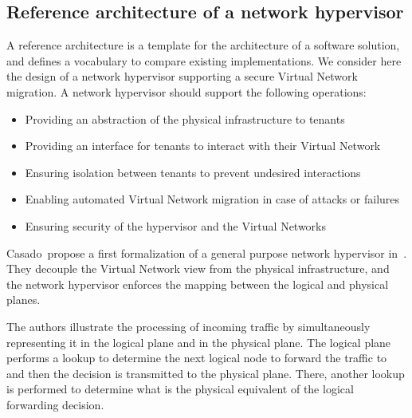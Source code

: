\newpage
\subsection{Reference architecture of a network hypervisor}
\label{sec:reference_archi}
A reference architecture is a template for the architecture of a software solution, and defines a vocabulary to compare existing implementations. 
We consider here the design of a network hypervisor supporting a secure Virtual Network migration.
A network hypervisor should support the following operations:
\begin{itemize}
    \item Providing an abstraction of the physical infrastructure to tenants
    \item Providing an interface for tenants to interact with their Virtual Network
    \item Ensuring isolation between tenants to prevent undesired interactions 
    \item Enabling automated Virtual Network migration in case of attacks or failures
    \item Ensuring security of the hypervisor and the Virtual Networks
\end{itemize}

Casado~\etal propose a first formalization of a general purpose network hypervisor in~\cite{Netvirt_Definition-Casado2010}. They decouple the Virtual Network view from the physical infrastructure, and the network hypervisor enforces the mapping between the logical and physical planes.

The authors illustrate the processing of incoming traffic by simultaneously representing it in the logical plane and in the physical plane.
The logical plane performs a lookup to determine the next logical node to forward the traffic to and then the decision is transmitted to the physical plane. There, another lookup is performed to determine what is the physical equivalent of the logical forwarding decision.

